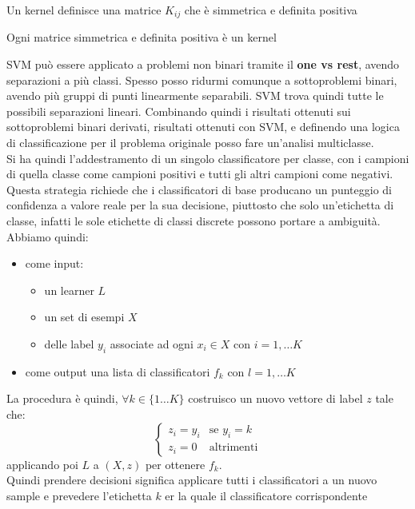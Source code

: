 \begin{definizione}
  Un kernel definisce una matrice $K_{ij}$ che è simmetrica e definita positiva
\end{definizione}
\begin{definizione}
  Ogni matrice simmetrica e definita positiva è un kernel
\end{definizione}
SVM può essere applicato a problemi non binari tramite il \textbf{one vs rest},
avendo separazioni a più classi. Spesso posso ridurmi comunque a sottoproblemi
binari, avendo più gruppi di punti linearmente separabili. SVM trova quindi
tutte le possibili separazioni lineari. Combinando quindi i risultati ottenuti
sui sottoproblemi binari derivati, risultati ottenuti con SVM, e definendo una
logica di classificazione per il problema originale posso fare un'analisi
multiclasse.\\
Si ha quindi l'addestramento di un singolo classificatore per classe, con i
campioni di quella classe come campioni positivi e tutti gli altri campioni come
negativi.\\
Questa strategia richiede che i classificatori di base producano un punteggio di
confidenza a valore reale per la sua decisione, piuttosto che solo un'etichetta
di classe, infatti le sole etichette di classi discrete possono portare a
ambiguità.
\newpage
Abbiamo quindi:
\begin{itemize}
  \item come input:
  \begin{itemize}
    \item un learner $L$
    \item un set di esempi $X$
    \item delle label $y_i$ associate ad ogni $x_i\in X$ con $i=1,\ldots K$
  \end{itemize}
  \item come output una lista di classificatori $f_k$ con $l=1,\ldots K$
\end{itemize}
La procedura è quindi, $\forall k\in \{1\ldots K\}$ costruisco un nuovo vettore
di label $z$ tale che:
\[
  \begin{cases}
    z_i=y_i&\mbox{se } y_i=k\\
    z_i=0&\mbox{altrimenti}
  \end{cases}
\]
applicando poi $L$ a $(X, z)$ per ottenere $f_k$.\\
Quindi prendere decisioni significa applicare tutti i classificatori a un nuovo
sample e prevedere l'etichetta $k$ er la quale il classificatore corrispondente
